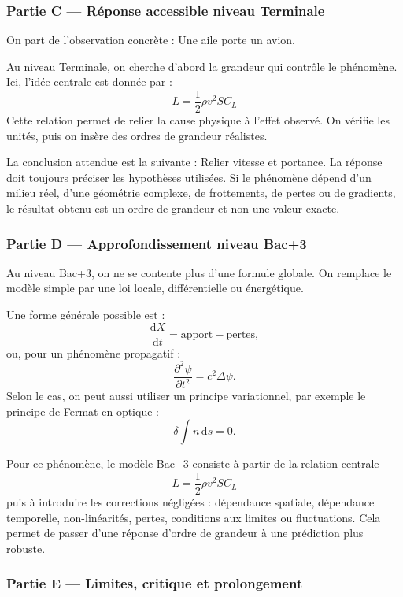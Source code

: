 \documentclass[11pt,a4paper]{article}
\begin{document}
\subsubsection*{Partie C — Réponse accessible niveau Terminale}

\begin{corrigebox}
On part de l'observation concrète : Une aile porte un avion.

Au niveau Terminale, on cherche d'abord la grandeur qui contrôle le phénomène. Ici, l'idée centrale est donnée par :
\[
L=\frac12\rho v^2SC_L
\]
Cette relation permet de relier la cause physique à l'effet observé. On vérifie les unités, puis on insère des ordres de grandeur réalistes.

La conclusion attendue est la suivante : Relier vitesse et portance. La réponse doit toujours préciser les hypothèses utilisées. Si le phénomène dépend d'un milieu réel, d'une géométrie complexe, de frottements, de pertes ou de gradients, le résultat obtenu est un ordre de grandeur et non une valeur exacte.
\end{corrigebox}

\subsubsection*{Partie D — Approfondissement niveau Bac+3}

\begin{approfondissementbox}
Au niveau Bac+3, on ne se contente plus d'une formule globale. On remplace le modèle simple par une loi locale, différentielle ou énergétique.

Une forme générale possible est :
\[
\frac{\mathrm d X}{\mathrm dt}=\text{apport}-\text{pertes},
\]
ou, pour un phénomène propagatif :
\[
\frac{\partial^2 \psi}{\partial t^2}=c^2\Delta\psi.
\]
Selon le cas, on peut aussi utiliser un principe variationnel, par exemple le principe de Fermat en optique :
\[
\delta \int n\,\mathrm ds=0.
\]

Pour ce phénomène, le modèle Bac+3 consiste à partir de la relation centrale
\[
L=\frac12\rho v^2SC_L
\]
puis à introduire les corrections négligées : dépendance spatiale, dépendance temporelle, non-linéarités, pertes, conditions aux limites ou fluctuations. Cela permet de passer d'une réponse d'ordre de grandeur à une prédiction plus robuste.
\end{approfondissementbox}

\subsubsection*{Partie E — Limites, critique et prolongement}
\end{document}
